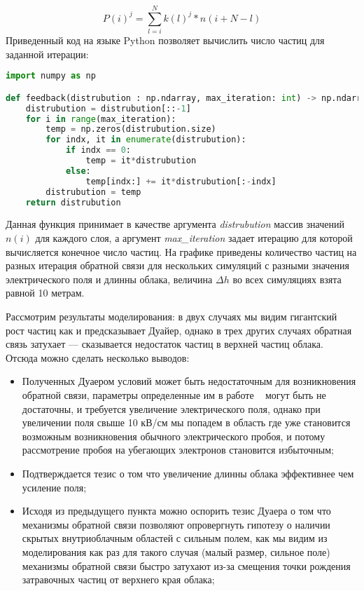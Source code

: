 \begin{equation}
P(i)^{j} = \sum_{l=i}^{N} k(l)^j * n(i+N-l)
\end{equation}
Приведенный код на языке Python позволяет вычислить число частиц для заданной итерации:
\begin{lstlisting}[language=Python]
import numpy as np

def feedback(distrubution : np.ndarray, max_iteration: int) -> np.ndarray:
    distrubution = distrubution[::-1]
    for i in range(max_iteration):
        temp = np.zeros(distrubution.size)
        for indx, it in enumerate(distrubution):
            if indx == 0:
                temp = it*distrubution
            else:
                temp[indx:] += it*distrubution[:-indx]
        distrubution = temp
    return distrubution
\end{lstlisting}
Данная функция принимает в качестве аргумента \textit{distrubution} массив значений $n(i)$ для каждого слоя, а аргумент \textit{max\_iteration} задает итерацию для которой вычисляется конечное число частиц. На графике приведены количество частиц на разных итерация обратной связи для нескольких симуляций с разными значения электрического поля и длинны облака, величина $\Delta h$ во всех симуляциях взята равной 10 метрам. 

Рассмотрим результаты моделирования: в двух случаях мы видим гигантский рост частиц как и предсказывает Дуайер, однако в трех других случаях обратная связь затухает --- сказывается недостаток частиц в верхней частиц облака. Отсюда можно сделать несколько выводов: 
\begin{itemize}
    \item Полученных Дуаером условий может быть недостаточным для возникновения обратной связи, параметры определенные им в работе ~\cite{} могут быть не достаточны, и требуется увеличение электрического поля, однако при увеличении поля свыше 10 кВ/см мы попадем в область где уже становится возможным возникновения обычного электрического пробоя, и потому рассмотрение пробоя на убегающих электронов становится избыточным;
    \item Подтверждается тезис о том что увеличение длинны облака эффективнее чем усиление поля;
    \item Исходя из предыдущего пункта можно оспорить тезис Дуаера о том что механизмы обратной связи позволяют опровергнуть гипотезу о наличии скрытых внутриоблачным областей с сильным полем, как мы видим из моделирования как раз для такого случая (малый размер, сильное поле) механизмы обратной связи быстро затухают из-за смещения точки рождения затравочных частиц от верхнего края облака;
\end{itemize}


